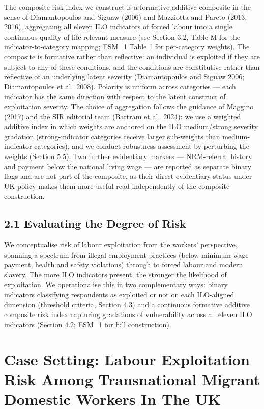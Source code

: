 \documentclass[
  12pt,
  letterpaper,
  DIV=11,
  numbers=noendperiod]{scrartcl}
\begin{document}
The composite risk index we construct is a formative additive composite
in the sense of Diamantopoulos and Siguaw (2006) and Mazziotta and
Pareto (2013, 2016), aggregating all eleven ILO indicators of forced
labour into a single continuous quality-of-life-relevant measure (see
Section 3.2, Table M for the indicator-to-category mapping; ESM\_1 Table
1 for per-category weights). The composite is formative rather than
reflective: an individual is exploited if they are subject to any of
these conditions, and the conditions are constitutive rather than
reflective of an underlying latent severity (Diamantopoulos and Siguaw
2006; Diamantopoulos et al.~2008). Polarity is uniform across categories
--- each indicator has the same direction with respect to the latent
construct of exploitation severity. The choice of aggregation follows
the guidance of Maggino (2017) and the SIR editorial team (Bartram et
al.~2024): we use a weighted additive index in which weights are
anchored on the ILO medium/strong severity gradation (strong-indicator
categories receive larger sub-weights than medium-indicator categories),
and we conduct robustness assessment by perturbing the weights (Section
5.5). Two further evidentiary markers --- NRM-referral history and
payment below the national living wage --- are reported as separate
binary flags and are not part of the composite, as their direct
evidentiary status under UK policy makes them more useful read
independently of the composite construction.

\subsection{2.1 Evaluating the Degree of
Risk}\label{evaluating-the-degree-of-risk}

We conceptualise risk of labour exploitation from the workers'
perspective, spanning a spectrum from illegal employment practices
(below-minimum-wage payment, health and safety violations) through to
forced labour and modern slavery. The more ILO indicators present, the
stronger the likelihood of exploitation. We operationalise this in two
complementary ways: binary indicators classifying respondents as
exploited or not on each ILO-aligned dimension (threshold criteria,
Section 4.3) and a continuous formative additive composite risk index
capturing gradations of vulnerability across all eleven ILO indicators
(Section 4.2; ESM\_1 for full construction).

\section{Case Setting: Labour Exploitation Risk Among Transnational
Migrant Domestic Workers In The
UK}\label{case-setting-labour-exploitation-risk-among-transnational-migrant-domestic-workers-in-the-uk}
\end{document}
